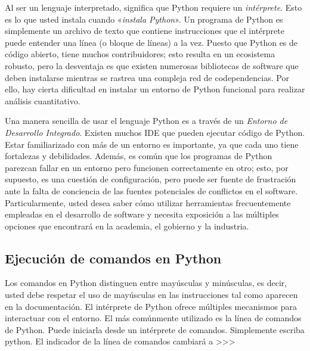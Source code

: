 Al ser un lenguaje interpretado, significa que Python requiere un \textit{intérprete}. Esto es lo que usted instala cuando «\textit{instala Python}». Un programa de Python es simplemente un archivo de texto que contiene instrucciones que el intérprete puede entender una línea (o bloque de líneas) a la vez. Puesto que Python es de código abierto, tiene muchos contribuidores; esto resulta en un ecosistema robusto, pero la desventaja es que existen numerosas bibliotecas de software que deben instalarse mientras se rastrea una compleja red de codependencias. Por ello, hay cierta dificultad en instalar un entorno de Python funcional para realizar análisis cuantitativo.


Una manera sencilla de usar el lenguaje Python es a través de un \textit{Entorno de Desarrollo Integrado}. Existen muchos IDE que pueden ejecutar código de Python. Estar familiarizado con más de un entorno es importante, ya que cada uno tiene fortalezas y debilidades. Además, es común que los programas de Python parezcan fallar en un entorno pero funcionen correctamente en otro; esto, por supuesto, es una cuestión de configuración, pero puede ser fuente de frustración ante la falta de conciencia de las fuentes potenciales de conflictos en el software. Particularmente, usted desea saber cómo utilizar herramientas frecuentemente empleadas en el desarrollo de software y necesita exposición a las múltiples opciones que encontrará en la academia, el gobierno y la industria.


\subsection{Ejecución de comandos en Python}

Los comandos en Python distinguen entre mayúsculas y minúsculas, es decir, usted debe respetar el uso de mayúsculas en las instrucciones tal como aparecen en la documentación. El intérprete de Python ofrece múltiples mecanismos para interactuar con el entorno. El más comúnmente utilizado es la línea de comandos de Python. Puede iniciarla desde un intérprete de comandos. Simplemente escriba {\s python}. El indicador de la línea de comandos cambiará a {\s >>> }

